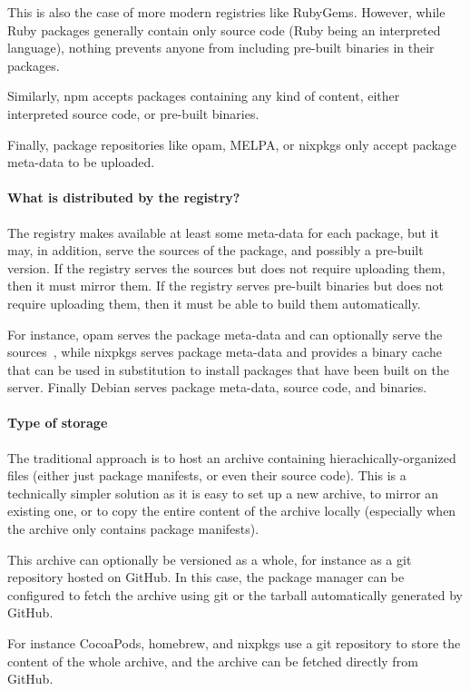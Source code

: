 This is also the case of more modern registries like RubyGems.
However, while Ruby packages generally contain only source code (Ruby being an interpreted language), nothing prevents anyone from including pre-built binaries in their packages.

Similarly, npm accepts packages containing any kind of content, either interpreted source code, or pre-built binaries.

Finally, package repositories like opam, MELPA, or nixpkgs only accept package meta-data to be uploaded.

\paragraph{What is distributed by the registry?}

The registry makes available at least some meta-data for each package, but it may, in addition, serve the sources of the package, and possibly a pre-built version.
If the registry serves the sources but does not require uploading them, then it must mirror them.
If the registry serves pre-built binaries but does not require uploading them, then it must be able to build them automatically.

For instance, opam serves the package meta-data and can optionally serve the sources~\cite{opam_manual}, while nixpkgs serves package meta-data and provides a binary cache that can be used in substitution to install packages that have been built on the server.
Finally Debian serves package meta-data, source code, and binaries.

\paragraph{Type of storage}

The traditional approach is to host an archive containing hierachically-organized files (either just package manifests, or even their source code).
This is a technically simpler solution as it is easy to set up a new archive, to mirror an existing one, or to copy the entire content of the archive locally (especially when the archive only contains package manifests).

This archive can optionally be versioned as a whole, for instance as a git repository hosted on GitHub.
In this case, the package manager can be configured to fetch the archive using git or the tarball automatically generated by GitHub.

For instance CocoaPods, homebrew, and nixpkgs use a git repository to store the content of the whole archive, and the archive can be fetched directly from GitHub.

